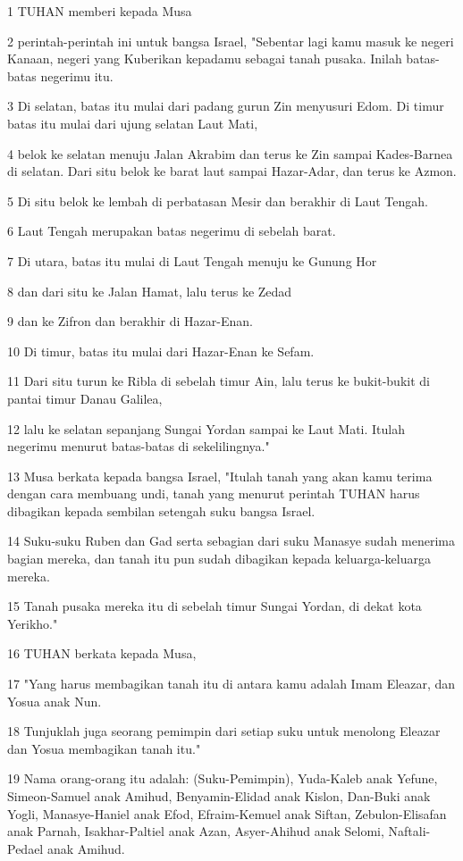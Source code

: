 \par 1 TUHAN memberi kepada Musa
\par 2 perintah-perintah ini untuk bangsa Israel, "Sebentar lagi kamu masuk ke negeri Kanaan, negeri yang Kuberikan kepadamu sebagai tanah pusaka. Inilah batas-batas negerimu itu.
\par 3 Di selatan, batas itu mulai dari padang gurun Zin menyusuri Edom. Di timur batas itu mulai dari ujung selatan Laut Mati,
\par 4 belok ke selatan menuju Jalan Akrabim dan terus ke Zin sampai Kades-Barnea di selatan. Dari situ belok ke barat laut sampai Hazar-Adar, dan terus ke Azmon.
\par 5 Di situ belok ke lembah di perbatasan Mesir dan berakhir di Laut Tengah.
\par 6 Laut Tengah merupakan batas negerimu di sebelah barat.
\par 7 Di utara, batas itu mulai di Laut Tengah menuju ke Gunung Hor
\par 8 dan dari situ ke Jalan Hamat, lalu terus ke Zedad
\par 9 dan ke Zifron dan berakhir di Hazar-Enan.
\par 10 Di timur, batas itu mulai dari Hazar-Enan ke Sefam.
\par 11 Dari situ turun ke Ribla di sebelah timur Ain, lalu terus ke bukit-bukit di pantai timur Danau Galilea,
\par 12 lalu ke selatan sepanjang Sungai Yordan sampai ke Laut Mati. Itulah negerimu menurut batas-batas di sekelilingnya."
\par 13 Musa berkata kepada bangsa Israel, "Itulah tanah yang akan kamu terima dengan cara membuang undi, tanah yang menurut perintah TUHAN harus dibagikan kepada sembilan setengah suku bangsa Israel.
\par 14 Suku-suku Ruben dan Gad serta sebagian dari suku Manasye sudah menerima bagian mereka, dan tanah itu pun sudah dibagikan kepada keluarga-keluarga mereka.
\par 15 Tanah pusaka mereka itu di sebelah timur Sungai Yordan, di dekat kota Yerikho."
\par 16 TUHAN berkata kepada Musa,
\par 17 "Yang harus membagikan tanah itu di antara kamu adalah Imam Eleazar, dan Yosua anak Nun.
\par 18 Tunjuklah juga seorang pemimpin dari setiap suku untuk menolong Eleazar dan Yosua membagikan tanah itu."
\par 19 Nama orang-orang itu adalah: (Suku-Pemimpin), Yuda-Kaleb anak Yefune, Simeon-Samuel anak Amihud, Benyamin-Elidad anak Kislon, Dan-Buki anak Yogli, Manasye-Haniel anak Efod, Efraim-Kemuel anak Siftan, Zebulon-Elisafan anak Parnah, Isakhar-Paltiel anak Azan, Asyer-Ahihud anak Selomi, Naftali-Pedael anak Amihud.
